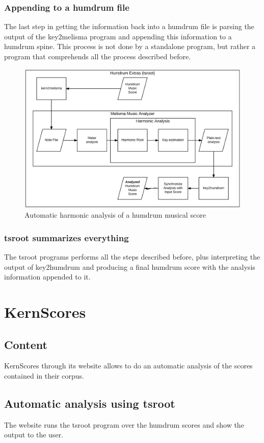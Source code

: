   \subsubsection{Appending to a humdrum file}
    The last step in getting the information back into a humdrum file is parsing the output of the key2melisma program and appending this information to a humdrum spine. This process is not done by a standalone program, but rather a program that comprehends all the process described before.

    \begin{figure}[ht]
      \centering
        \includegraphics[width=1.0\textwidth]{04-methodology/figures/3}
      \caption{Automatic harmonic analysis of a humdrum musical score}
      \label{fig:software_stack3}
    \end{figure}

  \subsubsection{tsroot summarizes everything}
    The tsroot programs performs all the steps described before, plus interpreting the output of key2humdrum and producing a final humdrum score with the analysis information appended to it.
\section{KernScores}
  \subsection{Content}
  KernScores through its website allows to do an automatic analysis of the scores contained in their corpus.
  \subsection{Automatic analysis using tsroot}
  The website runs the tsroot program over the humdrum scores and show the output to the user.
